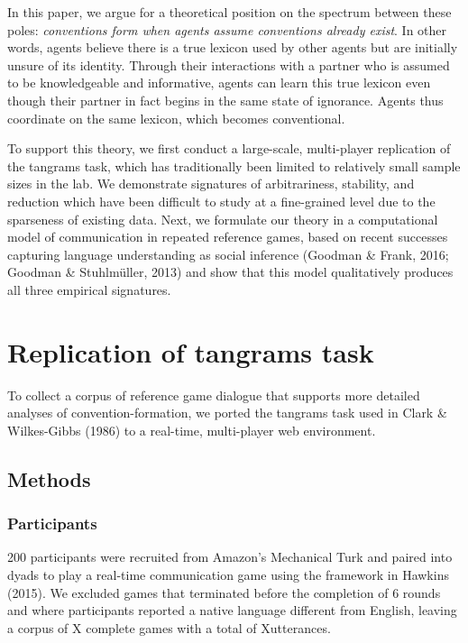 \documentclass[10pt, letterpaper]{article}
\begin{document}
In this paper, we argue for a theoretical position on the spectrum
between these poles: \emph{conventions form when agents assume
conventions already exist}. In other words, agents believe there is a
true lexicon used by other agents but are initially unsure of its
identity. Through their interactions with a partner who is assumed to be
knowledgeable and informative, agents can learn this true lexicon even
though their partner in fact begins in the same state of ignorance.
Agents thus coordinate on the same lexicon, which becomes conventional.

To support this theory, we first conduct a large-scale, multi-player
replication of the tangrams task, which has traditionally been limited
to relatively small sample sizes in the lab. We demonstrate signatures
of arbitrariness, stability, and reduction which have been difficult to
study at a fine-grained level due to the sparseness of existing data.
Next, we formulate our theory in a computational model of communication
in repeated reference games, based on recent successes capturing
language understanding as social inference (Goodman \& Frank, 2016;
Goodman \& Stuhlmüller, 2013) and show that this model qualitatively
produces all three empirical signatures.

\section{Replication of tangrams
task}\label{replication-of-tangrams-task}

To collect a corpus of reference game dialogue that supports more
detailed analyses of convention-formation, we ported the tangrams task
used in Clark \& Wilkes-Gibbs (1986) to a real-time, multi-player web
environment.

\subsection{Methods}\label{methods}

\subsubsection{Participants}\label{participants}

200 participants were recruited from Amazon's Mechanical Turk and paired
into dyads to play a real-time communication game using the framework in
Hawkins (2015). We excluded games that terminated before the completion
of 6 rounds and where participants reported a native language different
from English, leaving a corpus of X complete games with a total of
Xutterances.
\end{document}
